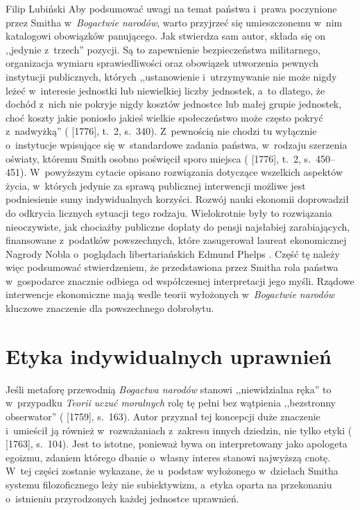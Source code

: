 \begin{artplenv}{Filip Lubiński}
Aby podsumować uwagi na temat państwa i~prawa poczynione przez Smitha w~\textit{Bogactwie narodów}, warto przyjrzeć
się umieszczonemu w~nim katalogowi obowiązków panującego. Jak stwierdza sam autor, składa się on ,,jedynie z~trzech''
pozycji. Są to zapewnienie bezpieczeństwa militarnego, organizacja wymiaru sprawiedliwości oraz obowiązek utworzenia
pewnych instytucji publicznych, których ,,ustanowienie i~utrzymywanie nie może nigdy leżeć w~interesie jednostki lub
niewielkiej liczby jednostek, a~to dlatego, że dochód z~nich nie pokryje nigdy kosztów jednostce lub małej grupie
jednostek, choć koszty jakie poniosło jakieś wielkie społeczeństwo może często pokryć z~nadwyżką''
(\cite{smith_badania_2007} [1776], t.~2, s.~340).
Z~pewnością nie chodzi tu wyłącznie o~instytucje wpisujące
się w~standardowe zadania państwa, w~rodzaju szerzenia oświaty, któremu Smith osobno poświęcił sporo miejsca
(\cite{smith_badania_2007} [1776], t.~2, s.~450--451).
W~powyższym cytacie opisano rozwiązania dotyczące
wszelkich aspektów życia, w~których jedynie za sprawą publicznej interwencji możliwe jest podniesienie sumy
indywidualnych korzyści. Rozwój nauki ekonomii doprowadził do odkrycia licznych sytuacji tego rodzaju. Wielokrotnie
były to rozwiązania nieoczywiste, jak chociażby publiczne dopłaty do pensji najsłabiej zarabiających,
finansowane z~podatków powszechnych, które zasugerował laureat ekonomicznej Nagrody Nobla o~poglądach libertariańskich Edmund Phelps
\parencite{phelps_placa_2013}.
Część tę należy więc podsumować stwierdzeniem, że przedstawiona przez Smitha
rola państwa w~gospodarce znacznie odbiega od współczesnej interpretacji jego myśli. Rządowe interwencje ekonomiczne
mają wedle teorii wyłożonych w~\textit{Bogactwie narodów} kluczowe znaczenie dla powszechnego dobrobytu. 

\section{Etyka indywidualnych uprawnień}
Jeśli metaforę przewodnią \textit{Bogactwa narodów} stanowi ,,niewidzialna ręka'' to w~przypadku \textit{Teorii uczuć
moralnych} rolę tę pełni bez wątpienia ,,bezstronny obserwator''
(\cite{smith_teoria_1989} [1759], s.~163).
Autor przyznał tej koncepcji duże znaczenie i~umieścił ją również w~rozważaniach z~zakresu innych dziedzin, nie tylko
etyki
(\cite{smith_lectures_1982} [1763], s.~104).
Jest to istotne, ponieważ bywa on interpretowany jako
apologeta egoizmu, zdaniem którego dbanie o~własny interes stanowi najwyższą cnotę. W~tej części zostanie wykazane,
że u~podstaw wyłożonego w~dziełach Smitha systemu filozoficznego leży nie subiektywizm, a~etyka oparta na
przekonaniu o~istnieniu przyrodzonych każdej jednostce uprawnień.


\end{artplenv}
